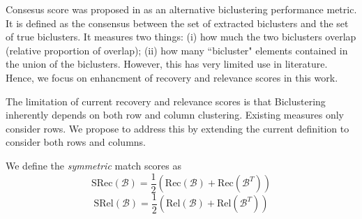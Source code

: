 

Consesus score was proposed in \cite{hochreiter2010fabia} as an alternative biclustering performance metric. It is defined as the consensus between the set of extracted biclusters and the set of true biclusters. It measures two things: (i) how much the two biclusters overlap (relative proportion of overlap); (ii) how many ``bicluster" elements contained in the union of the biclusters.
However, this has very limited use in literature. Hence, we focus on enhancment of recovery and relevance scores in this work. 


\begin{comment}
(1) compute similarities between all pairs of biclusters by using Jaccard index, where one is from set $\mathcal{X}$ and the other from the set $\mathcal{Y}$;
(2) assign the biclusters of one set to biclusters of the other set by maximizing the assignment by the Munkres algorithm, which is used to find the optimal assignment of n extracted biclusters to n ground truth biclusters.
A set of elements of a matrix are said to
be independent if no two of them lie in the same line (the word "line" applies
both to the rows and to the columns of a matrix). 
(3) divide the (sum of similarities of the assigned biclusters by the number of biclusters of the larger set.
   sum  (similarities  of  assigned biclusters )/ number of larger set
Note that : Step (3) is used to  penalizes different numbers of biclusters.The highest consensus is 1 and only obtained for identical sets of biclusters.
\end{comment}

The limitation of current recovery and relevance scores is that Biclustering inherently depends on both row and column clustering. 
Existing measures only consider rows. We propose to address this by extending the current definition to consider both rows and columns.

We define the \emph{symmetric} match scores as
\begin{equation}
    \text{SRec}(\mathcal{B}) = \frac{1}{2} \left( \text{Rec}(\mathcal{B}) + \text{Rec}(\mathcal{B}^T)\right)
\end{equation}
\begin{equation}
    \text{SRel}(\mathcal{B}) = \frac{1}{2} \left( \text{Rel}(\mathcal{B}) + \text{Rel}(\mathcal{B}^T)\right)
\end{equation}

